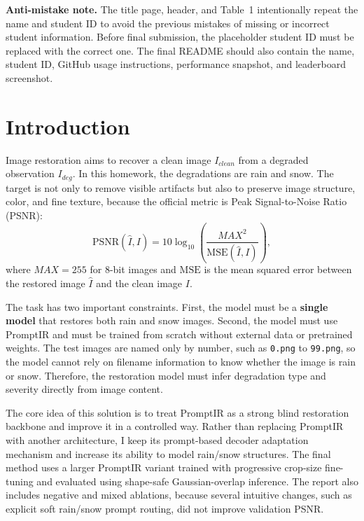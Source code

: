 \documentclass[10pt,conference]{article}
\begin{document}
\noindent\textbf{Anti-mistake note.} The title page, header, and Table~1 intentionally repeat the name and student ID to avoid the previous mistakes of missing or incorrect student information. Before final submission, the placeholder student ID must be replaced with the correct one. The final README should also contain the name, student ID, GitHub usage instructions, performance snapshot, and leaderboard screenshot.

\section{Introduction}

Image restoration aims to recover a clean image $I_{clean}$ from a degraded observation $I_{deg}$. In this homework, the degradations are rain and snow. The target is not only to remove visible artifacts but also to preserve image structure, color, and fine texture, because the official metric is Peak Signal-to-Noise Ratio (PSNR):
\begin{equation}
    \mathrm{PSNR}(\hat{I}, I)=10\log_{10}\left(\frac{MAX^2}{\mathrm{MSE}(\hat{I}, I)}\right),
\end{equation}
where $MAX=255$ for 8-bit images and $\mathrm{MSE}$ is the mean squared error between the restored image $\hat{I}$ and the clean image $I$.

The task has two important constraints. First, the model must be a \textbf{single model} that restores both rain and snow images. Second, the model must use PromptIR and must be trained from scratch without external data or pretrained weights. The test images are named only by number, such as \texttt{0.png} to \texttt{99.png}, so the model cannot rely on filename information to know whether the image is rain or snow. Therefore, the restoration model must infer degradation type and severity directly from image content.

The core idea of this solution is to treat PromptIR as a strong blind restoration backbone and improve it in a controlled way. Rather than replacing PromptIR with another architecture, I keep its prompt-based decoder adaptation mechanism and increase its ability to model rain/snow structures. The final method uses a larger PromptIR variant trained with progressive crop-size fine-tuning and evaluated using shape-safe Gaussian-overlap inference. The report also includes negative and mixed ablations, because several intuitive changes, such as explicit soft rain/snow prompt routing, did not improve validation PSNR.
\end{document}
